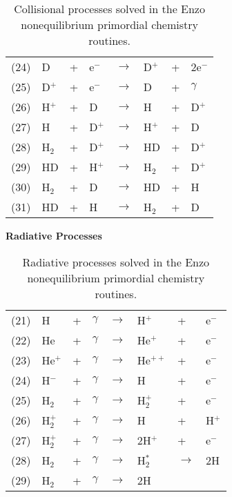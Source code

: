 \begin{table}
\begin{center}
\begin{tabular}{llllllll}
\hline
(24) & D & + & e$^-$ & $\rightarrow$ & D$^+$ &+& 2e$^-$ \\
(25) & D$^+$ &+ &e$^-$ & $\rightarrow$ & D &+ &$\gamma$ \\
(26) & H$^+$ &+ &D & $\rightarrow$ & H &+ &D$^+$ \\
(27) & H &+ &D$^+$ & $\rightarrow$ & H$^+$ &+ &D \\
(28) & H$_2$ &+ &D$^+$ & $\rightarrow$ & HD &+ &D$^+$ \\
(29) & HD &+ &H$^+$ & $\rightarrow$ & H$_2$ &+ &D$^+$ \\
(30) & H$_2$ &+ &D & $\rightarrow$ & HD &+ &H \\
(31) & HD &+ &H & $\rightarrow$ & H$_2$ &+ &D \\


\end{tabular}
\caption[]{Collisional processes solved in the Enzo nonequilibrium
primordial chemistry routines. }
\label{table.collisional}
\end{center}
\end{table}



\begin{table}
\begin{center}
{\bfseries Radiative Processes}\\[1ex]
\begin{tabular}{llllllll}
(21) & H & + & $\gamma$ & $\rightarrow$ & H$^+$ & + & e$^-$ \\
(22) & He & + & $\gamma$ & $\rightarrow$ & He$^+$ & + & e$^-$ \\
(23) & He$^+$ & + & $\gamma$ & $\rightarrow$ & He$^{++}$ & + & e$^-$ \\
(24) & H$^-$ & + & $\gamma$ & $\rightarrow$ & H & + & e$^-$ \\
(25) & H$_2$ & + & $\gamma$ & $\rightarrow$ & H$_2^+$ & + & e$^-$ \\
(26) & H$_2^+$ & + & $\gamma$ & $\rightarrow$ & H & + & H$^+$ \\
(27) & H$_2^+$ & + & $\gamma$ & $\rightarrow$ & 2H$^+$ & + & e$^-$ \\
(28) & H$_2$ & + & $\gamma$ & $\rightarrow$ & H$_2^*$ & $\rightarrow$ & 2H \\
(29) & H$_2$ & + & $\gamma$ & $\rightarrow$ & 2H &  & 
\end{tabular}
\caption[]{Radiative processes solved in the Enzo nonequilibrium
primordial chemistry routines. }
\label{table.radiative}
\end{center}
\end{table}
